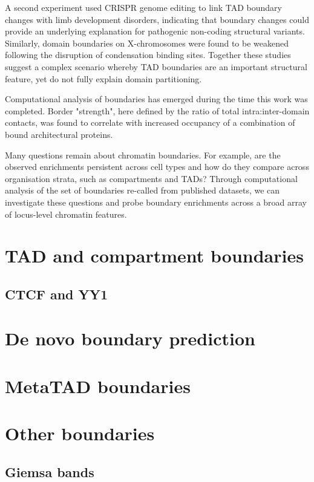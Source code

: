 \documentclass[a4paper,10pt,oneside]{book}
\begin{document}
A second experiment used CRISPR genome editing to link TAD boundary changes with limb development disorders,\cite{Lupianez2015} indicating that boundary changes could provide an underlying explanation for pathogenic non-coding structural variants.\cite{Ren2015} Similarly, domain boundaries on X-chromosomes were found to be weakened following the disruption of condensation binding sites.\cite{Crane2015} Together these studies suggest a complex scenario whereby TAD boundaries are an important structural feature, yet do not fully explain domain partitioning.

Computational analysis of boundaries has emerged during the time this work was completed. Border "strength", here defined by the ratio of total intra:inter-domain contacts, was found to correlate with increased occupancy of a combination of bound architectural proteins.\cite{VanBortle2014}

Many questions remain about chromatin boundaries. For example, are the observed enrichments persistent across cell types and how do they compare across organisation strata, such as compartments and TADs? Through computational analysis of the set of boundaries re-called from published datasets, we can investigate these questions and probe boundary enrichments across a broad array of locus-level chromatin features.

\section{TAD and compartment boundaries}

\subsection{CTCF and YY1}

\section{De novo boundary prediction}

\section{MetaTAD boundaries}

\section{Other boundaries}

\subsection{Giemsa bands}
\end{document}
